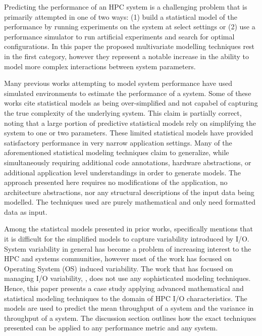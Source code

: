 \documentclass{scspaperproc}
\theoremstyle{scsthe}
\begin{document}
Predicting the performance of an HPC system is a challenging problem
that is primarily attempted in one of two ways: (1) build a
statistical model of the performance by running experiments on the
system at select settings or (2) use a performance simulator to run
artificial experiments and search for optimal configurations. In this
paper the proposed multivariate modelling techniques rest in the first
category, however they represent a notable increase in the ability to
model more complex interactions between system parameters.

Many previous works attempting to model system performance have used
simulated environments to estimate the performance of a
system. \cite{grobelny2007fase,wang2009simulation,wang2013towards}
Some of these works cite statistical models as being over-simplified
and not capabel of capturing the true complexity of the underlying
system. This claim is partially correct, noting that a large portion
of predictive statistical models rely on simplifying the system to one
or two parameters.
\cite{snavely2002framework,bailey2005performance,barker2009using,ye2010analyzing}
These limited statistical models have provided satisfactory
performance in very narrow application settings. Many of the
aforementioned statistical modeling techniques claim to generalize,
while simultaneously requiring additional code annotations, hardware
abstractions, or additional application level understandings in order
to generate models. The approach presented here requires no
modifications of the application, no architecture abstractions, nor
any structural descriptions of the input data being modelled. The
techniques used are purely mathematical and only need formatted data
as input.

Among the statistcal models presented in prior works,
\cite{bailey2005performance} specifically mentions that it is
difficult for the simplified models to capture variability introduced
by I/O. System variability in general has become a problem of
increasing interest to the HPC and systems communities, however most
of the work has focused on Operating System (OS) induced variability.
\cite{beckman2008benchmarking,de2007identifying} The work that
has focused on managing I/O variability, \cite{lofstead2010managing},
does not use any sophisticated modeling techniques. Hence, this paper
presents a case study applying advanced mathematical and statistical
modeling techniques to the domain of HPC I/O characteristics. The
models are used to predict the mean throughput of a system and the
variance in throughput of a system. The discussion section outlines
how the exact techniques presented can be applied to any performance
metric and any system.
\end{document}
